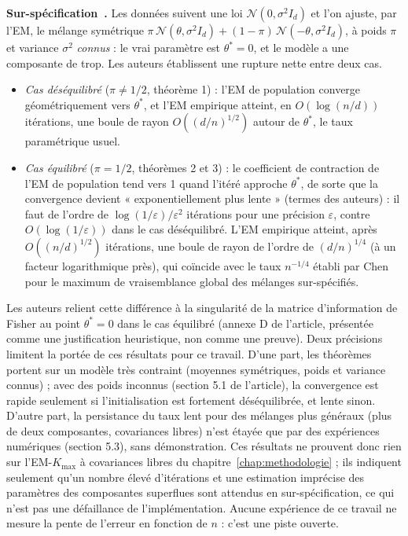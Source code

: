 \textbf{Sur-spécification~\cite{dwivedi2020}.} Les données suivent une loi $\mathcal{N}(0, \sigma^2 I_d)$ et l'on ajuste, par l'EM, le mélange symétrique $\pi\,\mathcal{N}(\theta, \sigma^2 I_d) + (1-\pi)\,\mathcal{N}(-\theta, \sigma^2 I_d)$, à poids $\pi$ et variance $\sigma^2$ \emph{connus} : le vrai paramètre est $\theta^* = 0$, et le modèle a une composante de trop. Les auteurs établissent une rupture nette entre deux cas.
\begin{itemize}
\item \emph{Cas déséquilibré} ($\pi \neq 1/2$, théorème 1) : l'EM de population converge géométriquement vers $\theta^*$, et l'EM empirique atteint, en $O(\log(n/d))$ itérations, une boule de rayon $O((d/n)^{1/2})$ autour de $\theta^*$, le taux paramétrique usuel.
\item \emph{Cas équilibré} ($\pi = 1/2$, théorèmes 2 et 3) : le coefficient de contraction de l'EM de population tend vers 1 quand l'itéré approche $\theta^*$, de sorte que la convergence devient « exponentiellement plus lente » (termes des auteurs) : il faut de l'ordre de $\log(1/\varepsilon)/\varepsilon^2$ itérations pour une précision $\varepsilon$, contre $O(\log(1/\varepsilon))$ dans le cas déséquilibré. L'EM empirique atteint, après $O((n/d)^{1/2})$ itérations, une boule de rayon de l'ordre de $(d/n)^{1/4}$ (à un facteur logarithmique près), qui coïncide avec le taux $n^{-1/4}$ établi par Chen~\cite{chen1995} pour le maximum de vraisemblance global des mélanges sur-spécifiés.
\end{itemize}
Les auteurs relient cette différence à la singularité de la matrice d'information de Fisher au point $\theta^* = 0$ dans le cas équilibré (annexe D de l'article, présentée comme une justification heuristique, non comme une preuve). Deux précisions limitent la portée de ces résultats pour ce travail. D'une part, les théorèmes portent sur un modèle très contraint (moyennes symétriques, poids et variance connus) ; avec des poids inconnus (section 5.1 de l'article), la convergence est rapide seulement si l'initialisation est fortement déséquilibrée, et lente sinon. D'autre part, la persistance du taux lent pour des mélanges plus généraux (plus de deux composantes, covariances libres) n'est étayée que par des expériences numériques (section 5.3), sans démonstration. Ces résultats ne prouvent donc rien sur l'EM-$K_{\max}$ à covariances libres du chapitre~\ref{chap:methodologie} ; ils indiquent seulement qu'un nombre élevé d'itérations et une estimation imprécise des paramètres des composantes superflues sont attendus en sur-spécification, ce qui n'est pas une défaillance de l'implémentation. Aucune expérience de ce travail ne mesure la pente de l'erreur en fonction de $n$ : c'est une piste ouverte.

